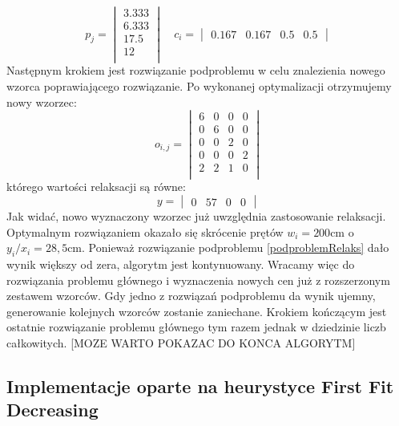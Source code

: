 \[
    p_j = 
    \begin{vmatrix}
        3.333 \\
        6.333 \\
        17.5 \\
        12 \\
    \end{vmatrix}
    \quad
    c_i = 
    \begin{vmatrix}
        0.167 & 0.167 & 0.5 & 0.5
    \end{vmatrix}
\]
Następnym krokiem jest rozwiązanie podproblemu w celu znalezienia nowego wzorca poprawiającego rozwiązanie. Po wykonanej optymalizacji otrzymujemy nowy wzorzec:
\[
    o_{i,j} = 
    \begin{vmatrix}
        6 & 0 & 0 & 0 \\
        0 & 6 & 0 & 0 \\
        0 & 0 & 2 & 0 \\
        0 & 0 & 0 & 2 \\
        2 & 2 & 1 & 0 \\
    \end{vmatrix}
\]
którego wartości relaksacji są równe:
\[
    y =     
    \begin{vmatrix}
        0 & 57 & 0 & 0
    \end{vmatrix}
\]
Jak widać, nowo wyznaczony wzorzec już uwzględnia zastosowanie relaksacji. Optymalnym rozwiązaniem okazało się skrócenie prętów \(w_i = 200\text{cm}\) o \(y_i/x_i=28{,}5 \text{cm}\). Ponieważ rozwiązanie podproblemu \ref{podproblemRelaks} dało wynik większy od zera, algorytm jest kontynuowany. Wracamy więc do rozwiązania problemu głównego i wyznaczenia nowych cen już z rozszerzonym zestawem wzorców. Gdy jedno z rozwiązań podproblemu da wynik ujemny, generowanie kolejnych wzorców zostanie zaniechane. Krokiem kończącym jest ostatnie rozwiązanie problemu głównego tym razem jednak w dziedzinie liczb całkowitych.
[MOZE WARTO POKAZAC DO KONCA ALGORYTM]

\subsection{Implementacje oparte na heurystyce First Fit Decreasing}

